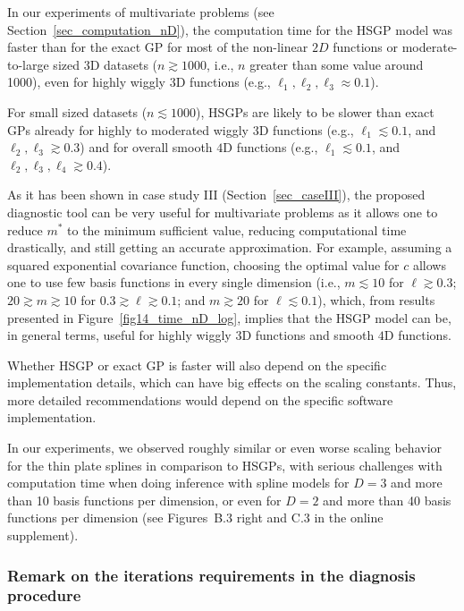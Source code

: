 In our experiments of multivariate problems (see Section~\ref{sec_computation_nD}), the computation time for the HSGP model was faster than for the exact GP for most of the non-linear $2D$ functions or moderate-to-large sized $3$D datasets ($n \gtrsim 1000$, i.e., $n$ greater than some value around 1000), even for highly wiggly 3D functions (e.g., $\ell_1, \ell_2, \ell_3 \approx 0.1$).

For small sized datasets ($n\lesssim 1000$), HSGPs are likely to be slower than exact GPs already for highly to moderated wiggly $3$D functions (e.g., $\ell_1 \lesssim 0.1$, and $\ell_2, \ell_3 \gtrsim 0.3$) and for overall smooth $4$D functions (e.g., $\ell_1 \lesssim 0.1$, and $\ell_2, \ell_3, \ell_4 \gtrsim 0.4$).

As it has been shown in case study III (Section~\ref{sec_caseIII}), the proposed diagnostic tool can be very useful for multivariate problems as it allows one to reduce $m^*$ to the minimum sufficient value, reducing computational time drastically, and still getting an accurate approximation. For example, assuming a squared exponential covariance function, choosing the optimal value for $c$ allows one to use few basis functions in every single dimension (i.e., $m \lesssim 10$ for $\ell \gtrsim 0.3$; $20 \gtrsim m \gtrsim 10$ for $0.3 \gtrsim \ell \gtrsim 0.1$; and $m \gtrsim 20$ for $\ell \lesssim 0.1$), which, from results presented in Figure~\ref{fig14_time_nD_log}, implies that the HSGP model can be, in general terms, useful for highly wiggly $3$D functions and smooth $4$D functions.

Whether HSGP or exact GP is faster will also depend on the specific implementation details, which can have big effects on the scaling constants. Thus, more detailed recommendations would depend on the specific software implementation.

In our experiments, we observed roughly similar or even worse scaling behavior for the thin plate splines in comparison to HSGPs, with serious challenges with computation time when doing inference with spline models for $D=3$ and more than 10 basis functions per dimension, or even for $D=2$ and more than 40 basis functions per dimension (see Figures~B.3 right and C.3 in the online supplement).

\subsubsection{Remark on the iterations requirements in the diagnosis procedure}\label{sec_requirements_diagnosis}

